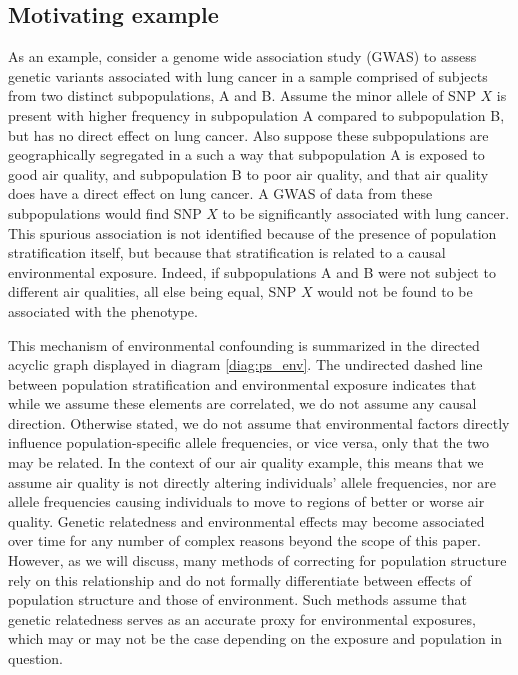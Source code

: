 \subsection{Motivating example} \label{sec:example}

As an example, consider a genome wide association study (GWAS) to assess genetic variants associated with lung cancer in a sample comprised of subjects from two distinct subpopulations, A and B. Assume the minor allele of SNP $X$ is present with higher frequency in subpopulation A compared to subpopulation B, but has no direct effect on lung cancer. Also suppose these subpopulations are geographically segregated in a such a way that subpopulation A is exposed to good air quality, and subpopulation B to poor air quality, and that air quality does have a direct effect on lung cancer. A GWAS of data from these subpopulations would find SNP $X$ to be significantly associated with lung cancer. This spurious association is not identified because of the presence of population stratification itself, but because that stratification is related to a causal environmental exposure. Indeed, if subpopulations A and B were not subject to different air qualities, all else being equal, SNP $X$ would not be found to be associated with the phenotype.


This mechanism of environmental confounding is summarized in the directed acyclic graph displayed in diagram \eqref{diag:ps_env}. The undirected dashed line between population stratification and environmental exposure indicates that while we assume these elements are correlated, we do not assume any causal direction. Otherwise stated, we do not assume that environmental factors directly influence population-specific allele frequencies, or vice versa, only that the two may be related. In the context of our air quality example, this means that we assume air quality is not directly altering individuals' allele frequencies, nor are allele frequencies causing individuals to move to regions of better or worse air quality. Genetic relatedness and environmental effects may become associated over time for any number of complex reasons beyond the scope of this paper. However, as we will discuss, many methods of correcting for population structure rely on this relationship and do not formally differentiate between effects of population structure and those of environment. Such methods assume that genetic relatedness serves as an accurate proxy for environmental exposures, which may or may not be the case depending on the exposure and population in question.

